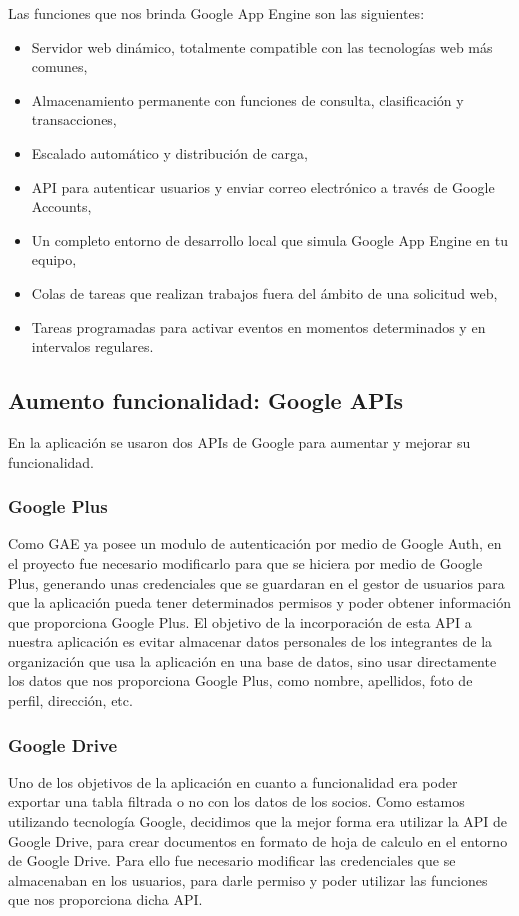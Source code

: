 Las funciones que nos brinda Google App Engine son las siguientes:

\begin{itemize}
  \item Servidor web dinámico, totalmente compatible con las tecnologías web más comunes,
  \item Almacenamiento permanente con funciones de consulta, clasificación y transacciones,
  \item Escalado automático y distribución de carga,
  \item API para autenticar usuarios y enviar correo electrónico a través de Google Accounts,
  \item Un completo entorno de desarrollo local que simula Google App Engine en tu equipo,
  \item Colas de tareas que realizan trabajos fuera del ámbito de una solicitud web,
  \item Tareas programadas para activar eventos en momentos determinados y en intervalos regulares.
\end{itemize}

\subsection{Aumento funcionalidad: Google APIs}


En la aplicación se usaron dos APIs de Google para aumentar y mejorar su funcionalidad. 


\subsubsection{Google Plus}
Como GAE ya posee un modulo de autenticación por medio de Google Auth,
en el proyecto fue necesario modificarlo para que se hiciera por medio de Google Plus, generando unas credenciales que se guardaran en el gestor de usuarios
para que la aplicación pueda tener determinados permisos y poder obtener información que proporciona Google Plus. El objetivo de la incorporación de esta 
API a nuestra aplicación es evitar almacenar datos personales de los integrantes de la organización que usa la aplicación en una base de datos, sino usar directamente los
datos que nos proporciona Google Plus, como nombre, apellidos, foto de perfil, dirección, etc.

\subsubsection{Google Drive}
Uno de los objetivos de la aplicación en cuanto a funcionalidad era poder exportar una tabla filtrada o no con los datos de los socios. Como estamos utilizando tecnología Google,
decidimos que la mejor forma era utilizar la API de Google Drive, para crear documentos en formato de hoja de calculo en el entorno de Google Drive. Para ello fue necesario
modificar las credenciales que se almacenaban en los usuarios, para darle permiso y poder utilizar las funciones que nos proporciona dicha API.

